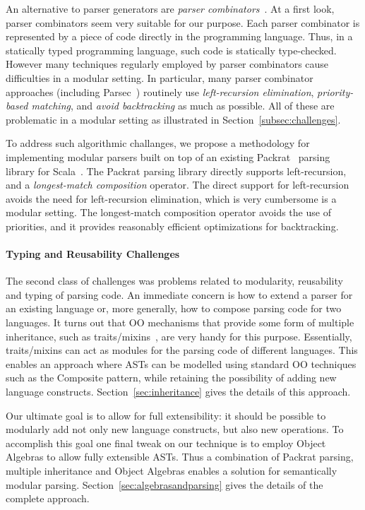   An alternative to parser generators are \emph{parser
    combinators}~\cite{burge1975,Wadler1985}.  At a first look, parser
  combinators seem very suitable for our purpose. Each parser
  combinator is represented by a piece of code directly in the
  programming language. Thus, in a statically typed programming
  language, such code is statically type-checked.  However many
  techniques regularly employed by parser combinators cause difficulties in a
  modular setting. In particular, many parser combinator approaches
  (including Parsec~\cite{Leijen2001}) routinely use \emph{left-recursion
    elimination}, \emph{priority-based matching}, and \emph{avoid
    backtracking} as much as possible. All of these are problematic in
  a modular setting as illustrated in Section~\ref{subsec:challenges}.

  To address such algorithmic challanges, we propose a methodology
  for implementing modular parsers built on top of an
  existing Packrat~\cite{Ford2002} parsing library for Scala~\cite{odersky2004overview}. The Packrat parsing library
  directly supports left-recursion, and a \emph{longest-match
    composition} operator. The direct support for left-recursion
  avoids the need for left-recursion elimination, which is very
  cumbersome is a modular setting. The longest-match composition
  operator avoids the use of priorities, and it provides reasonably
  efficient optimizations for backtracking.

  \paragraph{Typing and Reusability Challenges} The second class of
  challenges was problems related to modularity, reusability and
  typing of parsing code. An immediate concern is how to extend a
  parser for an existing language or, more generally, how to compose
  parsing code for two languages. It turns out that OO mechanisms that
  provide some form of multiple inheritance,
  such as traits/mixins~\cite{Bracha1990,Scharli2003}, are very handy for this
  purpose. Essentially, traits/mixins can act as modules for the parsing code
  of different languages. This enables an approach where ASTs can be
  modelled using standard OO techniques such as the {\sc Composite}
  pattern, while retaining the possibility of adding new language
  constructs. Section~\ref{sec:inheritance} gives the details of this approach.

  Our ultimate goal is to allow for full extensibility: it should be
  possible to modularly add not only new language constructs, but
  also new operations. To accomplish this goal one final tweak on our
  technique is to employ Object Algebras to allow fully extensible
  ASTs. Thus a combination of Packrat parsing, multiple inheritance
  and Object Algebras enables a solution for semantically modular
  parsing. Section~\ref{sec:algebrasandparsing} gives the details of the complete approach.

